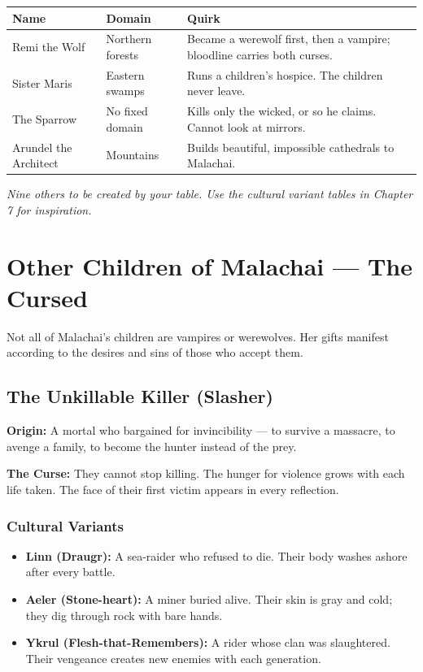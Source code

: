 \documentclass[10pt,twoside]{book}
\begin{document}
\begin{tabular}{@{}p{}p{}p{}@{}}
\toprule
\textbf{Name} & \textbf{Domain} & \textbf{Quirk} \\
\midrule
Remi the Wolf & Northern forests & Became a werewolf first, then a vampire; bloodline carries both curses. \\
Sister Maris & Eastern swamps & Runs a children's hospice. The children never leave. \\
The Sparrow & No fixed domain & Kills only the wicked, or so he claims. Cannot look at mirrors. \\
Arundel the Architect & Mountains & Builds beautiful, impossible cathedrals to Malachai. \\
\bottomrule
\end{tabular}

\textit{Nine others to be created by your table. Use the cultural variant tables in Chapter 7 for inspiration.}

\chapter{Other Children of Malachai --- The Cursed}

Not all of Malachai's children are vampires or werewolves. Her gifts manifest according to the desires and sins of those who accept them.

\section{The Unkillable Killer (Slasher)}

\textbf{Origin:} A mortal who bargained for invincibility --- to survive a massacre, to avenge a family, to become the hunter instead of the prey.

\textbf{The Curse:} They cannot stop killing. The hunger for violence grows with each life taken. The face of their first victim appears in every reflection.

\subsection*{Cultural Variants}
\begin{itemize}
\item \textbf{Linn (Draugr):} A sea-raider who refused to die. Their body washes ashore after every battle.
\item \textbf{Aeler (Stone-heart):} A miner buried alive. Their skin is gray and cold; they dig through rock with bare hands.
\item \textbf{Ykrul (Flesh-that-Remembers):} A rider whose clan was slaughtered. Their vengeance creates new enemies with each generation.
\end{itemize}
\end{document}
